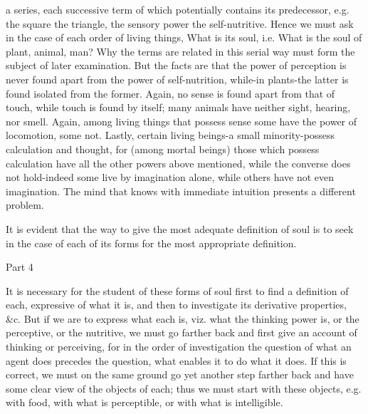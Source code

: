 a series, each successive term of which potentially contains its predecessor,
e.g. the square the triangle, the sensory power the self-nutritive.
Hence we must ask in the case of each order of living things, What
is its soul, i.e. What is the soul of plant, animal, man? Why the
terms are related in this serial way must form the subject of later
examination. But the facts are that the power of perception is never
found apart from the power of self-nutrition, while-in plants-the
latter is found isolated from the former. Again, no sense is found
apart from that of touch, while touch is found by itself; many animals
have neither sight, hearing, nor smell. Again, among living things
that possess sense some have the power of locomotion, some not. Lastly,
certain living beings-a small minority-possess calculation and thought,
for (among mortal beings) those which possess calculation have all
the other powers above mentioned, while the converse does not hold-indeed
some live by imagination alone, while others have not even imagination.
The mind that knows with immediate intuition presents a different
problem. 

It is evident that the way to give the most adequate definition of
soul is to seek in the case of each of its forms for the most appropriate
definition. 

Part 4

It is necessary for the student of these forms of soul first to find
a definition of each, expressive of what it is, and then to investigate
its derivative properties, &c. But if we are to express what each
is, viz. what the thinking power is, or the perceptive, or the nutritive,
we must go farther back and first give an account of thinking or perceiving,
for in the order of investigation the question of what an agent does
precedes the question, what enables it to do what it does. If this
is correct, we must on the same ground go yet another step farther
back and have some clear view of the objects of each; thus we must
start with these objects, e.g. with food, with what is perceptible,
or with what is intelligible. 


